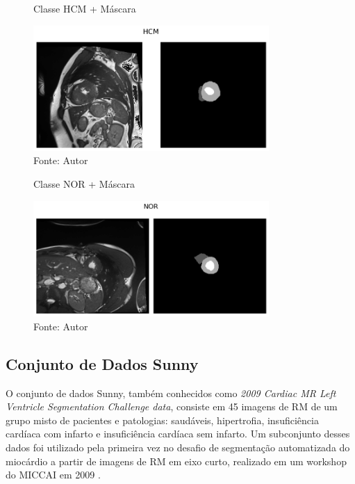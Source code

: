 \begin{figure}[H]
    \centering
    \caption{Classe HCM + Máscara}
    \includegraphics[width=0.8\textwidth]{figures/fig033-02.png}
    \caption*{Fonte: Autor}
    \label{fig:fig033-02}
\end{figure}

\begin{figure}[H]
    \centering
    \caption{Classe NOR + Máscara}
    \includegraphics[width=0.8\textwidth]{figures/fig033-03.png}
    \caption*{Fonte: Autor}
    \label{fig:fig033-03}
\end{figure}

\subsection{Conjunto de Dados Sunny} 
\label{subsec:cap4_sunny}

O conjunto de dados Sunny, também conhecidos como \textit{2009 Cardiac MR Left Ventricle Segmentation Challenge data}, consiste em 45 imagens de RM de um grupo misto de pacientes e patologias: saudáveis, hipertrofia, insuficiência cardíaca com infarto e insuficiência cardíaca sem infarto. Um subconjunto desses dados foi utilizado pela primeira vez no desafio de segmentação automatizada do miocárdio a partir de imagens de RM em eixo curto, realizado em um workshop do MICCAI em 2009 \cite{radauEvaluationFrameworkAlgorithms2009}. 

